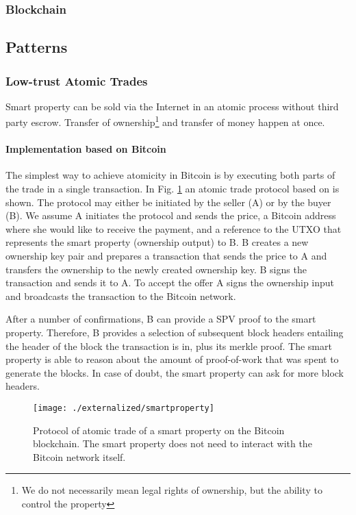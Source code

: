 \subsubsection{Blockchain}

\subsection{Patterns}

\subsubsection{Low-trust Atomic Trades}


Smart property can be sold via the Internet in an atomic process without third party escrow. Transfer of ownership\footnote{We do not necessarily mean legal rights of ownership, but the ability to control the property} and transfer of money happen at once.

\paragraph{Implementation based on Bitcoin}

The simplest way to achieve atomicity in Bitcoin is by executing both parts of the trade in a single transaction. In Fig. \ref{fig:smartproperty} an atomic trade protocol based on \cite{smartproperty2011} is shown. The protocol may either be initiated by the seller (A) or by the buyer (B). We assume A initiates the protocol and sends the price, a Bitcoin address where she would like to receive the payment, and a reference to the UTXO that represents the smart property (ownership output) to B. B creates a new ownership key pair and prepares a transaction that sends the price to A and transfers the ownership to the newly created ownership key. B signs the transaction and sends it to A. To accept the offer A signs the ownership input and broadcasts the transaction to the Bitcoin network. 

After a number of confirmations, B can provide a SPV proof to the smart property. Therefore, B provides a selection of subsequent block headers entailing the header of the block the transaction is in, plus its merkle proof. The smart property is able to reason about the amount of proof-of-work that was spent to generate the blocks. In case of doubt, the smart property can ask for more block headers.

\begin{figure}[!t]
    \centering
    \texttt{[image: ./externalized/smartproperty]}
    \caption{Protocol of atomic trade of a smart property on the Bitcoin blockchain. The smart property does not need to interact with the Bitcoin network itself.}
    \label{fig:smartproperty}
  \end{figure}

